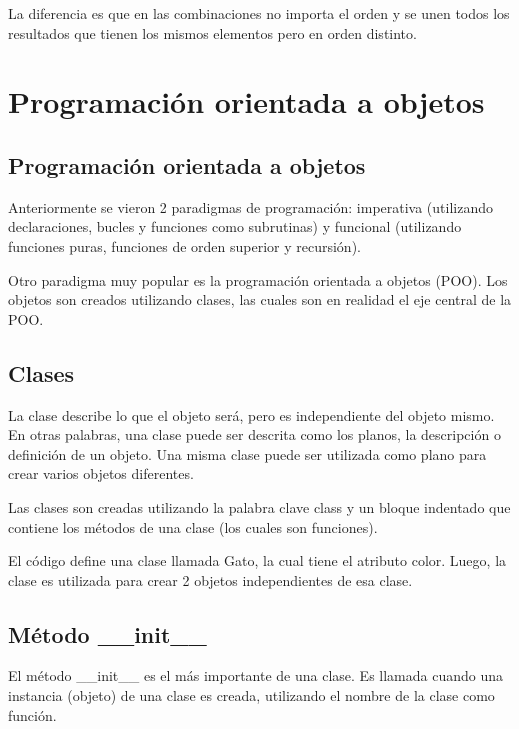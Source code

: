 \documentclass{report}
\begin{document}

La diferencia es que en las combinaciones no importa el orden y se unen todos los resultados que tienen los mismos elementos pero en orden distinto.

\clearpage\chapter{Programación orientada a objetos}


\section{Programación orientada a objetos}

Anteriormente se vieron 2 paradigmas de programación: imperativa (utilizando declaraciones, bucles y funciones como subrutinas) y funcional (utilizando funciones puras, funciones de orden superior y recursión).

Otro paradigma muy popular es la programación orientada a objetos (POO). Los objetos son creados utilizando clases, las cuales son en realidad el eje central de la POO.

\section{Clases}

La clase describe lo que el objeto será, pero es independiente del objeto mismo. En otras palabras, una clase puede ser descrita como los planos, la descripción o definición de un objeto. Una misma clase puede ser utilizada como plano para crear varios objetos diferentes.

Las clases son creadas utilizando la palabra clave class y un bloque indentado que contiene los métodos de una clase (los cuales son funciones).


El código define una clase llamada Gato, la cual tiene el atributo color. Luego, la clase es utilizada para crear 2 objetos independientes de esa clase.

\section{Método \_\_init\_\_}

El método \_\_init\_\_ es el más importante de una clase. Es llamada cuando una instancia (objeto) de una clase es creada, utilizando el nombre de la clase como función.
\end{document}
